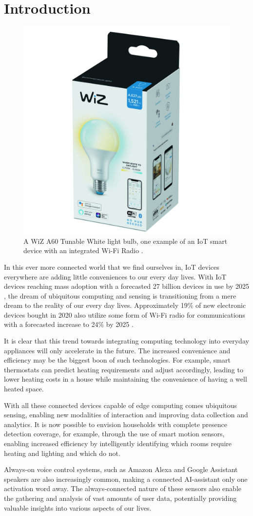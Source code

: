 \chapter{Introduction}\label{chapter:introduction}

\begin{figure}[b]
	\centering
	\includegraphics[width=0.3\linewidth]{figures/wiz-a60-tunable-white}
	\caption{A WiZ A60 Tunable White light bulb, one example of an IoT smart device with an integrated Wi-Fi Radio \cite{signify2020wiz}.}
	\label{fig:wiz-lightbulb}
\end{figure}

In this ever more connected world that we find ourselves in, IoT devices everywhere are adding little conveniences to our every day lives.
With IoT devices reaching mass adoption with a forecasted 27 billion devices in use by 2025 \cite{hasan2022state}, the dream of ubiquitous computing and sensing is transitioning from a mere dream to the reality of our every day lives.
Approximately 19\% of new electronic devices bought in 2020 also utilize some form of Wi-Fi radio for communications with a forecasted increase to 24\% by 2025 \cite{hasan2022state}.

It is clear that this trend towards integrating computing technology into everyday appliances will only accelerate in the future.
The increased convenience and efficiency may be the biggest boon of such technologies.
For example, smart thermostats can predict heating requirements and adjust accordingly, leading to lower heating costs in a house while maintaining the convenience of having a well heated space.

With all these connected devices capable of edge computing comes ubiquitous sensing, enabling new modalities of interaction and improving data collection and analytics.
It is now possible to envision households with complete presence detection coverage, for example, through the use of smart motion sensors, enabling increased efficiency by intelligently identifying which rooms require heating and lighting and which do not.

Always-on voice control systems, such as Amazon Alexa and Google Assistant speakers are also increasingly common, making a connected AI-assistant only one activation word away.
The always-connected nature of these sensors also enable the gathering and analysis of vast amounts of user data, potentially providing valuable insights into various aspects of our lives.

